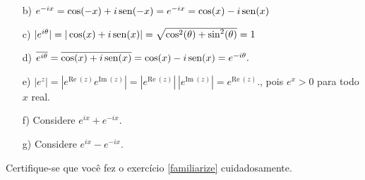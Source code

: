 \begin{Answer}
 \begin{itemize}
 \item [b)] $e^{-ix}=\cos(-x)+i\operatorname{sen}(-x)=e^{-ix}=\cos(x)-i\operatorname{sen}(x)$
 \item [c)] $|e^{i\theta}|=|\cos(x)+i\operatorname{sen}(x)|= \sqrt{\cos^2(\theta)+\sin^2(\theta)}=1$
 \item [d)] $\overline{e^{i\theta}}=\overline{\cos(x)+i\operatorname{sen}(x)}=\cos(x)-i\operatorname{sen}(x)=e^{-i\theta}.$
 \item [e)] $|e^{z}|=|e^{\text{Re}~\!( z)}e^{\text{Im}~\!( z)}|=|e^{\text{Re}~\!( z)}|~|e^{\text{Im}~\!( z)}|=e^{\text{Re}~\!( z)}.$, pois $e^x>0$ para todo $x$ real.
 \item [f)] Considere $e^{ix}+e^{-ix}$.
 \item [g)] Considere $e^{ix}-e^{-ix}$.
 \end{itemize}

\end{Answer}

\begin{Exercise} Certifique-se que você fez o exercício \ref{familiarize} cuidadosamente.
 
\end{Exercise}
